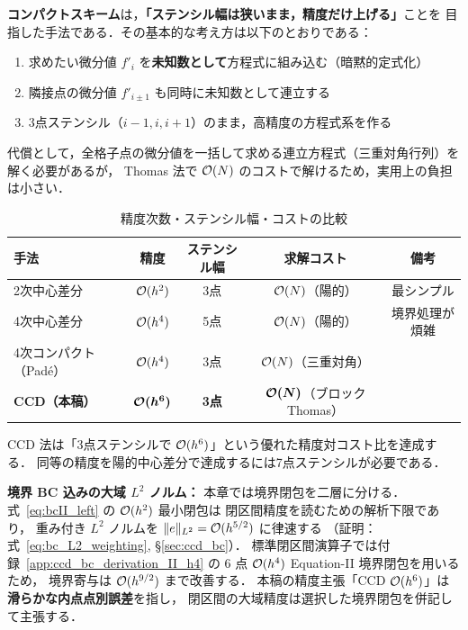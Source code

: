 \textbf{コンパクトスキーム}は，\textbf{「ステンシル幅は狭いまま，精度だけ上げる」}ことを
目指した手法である．その基本的な考え方は以下のとおりである：
\begin{enumerate}
  \item 求めたい微分値 $f'_i$ を\textbf{未知数として}方程式に組み込む（暗黙的定式化）
  \item 隣接点の微分値 $f'_{i\pm1}$ も同時に未知数として連立する
  \item 3点ステンシル（$i-1, i, i+1$）のまま，高精度の方程式系を作る
\end{enumerate}
代償として，全格子点の微分値を一括して求める連立方程式（三重対角行列）を解く必要があるが，
Thomas 法で $\mathcal{O}(N)$ のコストで解けるため，実用上の負担は小さい．

\begin{table}[htbp]
\caption{精度次数・ステンシル幅・コストの比較}
\begin{center}
\renewcommand{\arraystretch}{\PaperTableArrayStretch}
\begin{tabular}{lcccc}
\hline
手法 & 精度 & ステンシル幅 & 求解コスト & 備考 \\
\hline
2次中心差分 & $\mathcal{O}(h^2)$ & 3点 & $\mathcal{O}(N)$（陽的） & 最シンプル \\
4次中心差分 & $\mathcal{O}(h^4)$ & 5点 & $\mathcal{O}(N)$（陽的） & 境界処理が煩雑 \\
4次コンパクト（Padé） & $\mathcal{O}(h^4)$ & 3点 & $\mathcal{O}(N)$（三重対角） &~\cite{Lele1992} \\
\textbf{CCD（本稿）} & $\bm{\mathcal{O}(h^6)}$ & \textbf{3点} & $\bm{\mathcal{O}(N)}$（ブロック Thomas） &~\cite{ChuFan1998} \\
\hline
\end{tabular}
\end{center}
CCD 法は「3点ステンシルで $\mathcal{O}(h^6)$」という優れた精度対コスト比を達成する．
同等の精度を陽的中心差分で達成するには7点ステンシルが必要である．

\smallskip\noindent\textbf{境界 BC 込みの大域 $L^2$ ノルム：}
本章では境界閉包を二層に分ける．
式~\eqref{eq:bcII_left} の $\mathcal{O}(h^2)$ 最小閉包は
閉区間精度を読むための解析下限であり，
重み付き $L^2$ ノルムを $\|e\|_{L^2}=\mathcal{O}(h^{5/2})$ に律速する
（証明：式~\eqref{eq:bc_L2_weighting}, §\ref{sec:ccd_bc}）．
標準閉区間演算子では付録~\ref{app:ccd_bc_derivation_II_h4} の
6 点 $\mathcal{O}(h^4)$ Equation-II 境界閉包を用いるため，
境界寄与は $\mathcal{O}(h^{9/2})$ まで改善する．
本稿の精度主張「CCD $\mathcal{O}(h^6)$」は\textbf{滑らかな内点点別誤差}を指し，
閉区間の大域精度は選択した境界閉包を併記して主張する．
\end{table}

